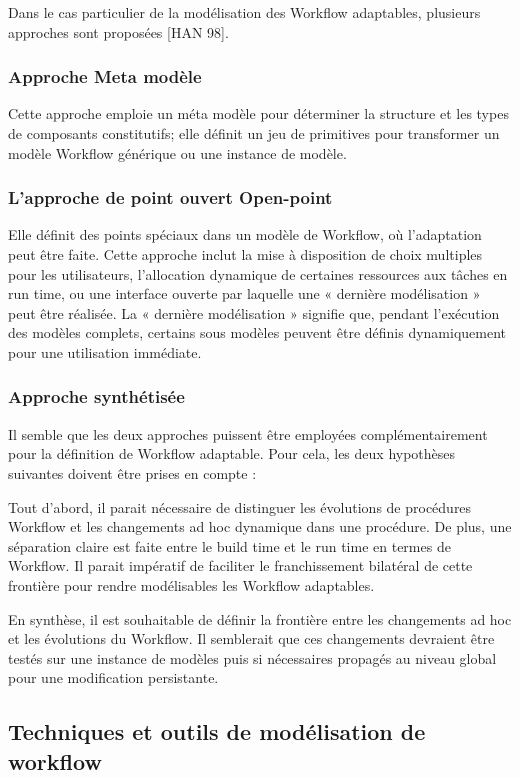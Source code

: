 Dans le cas particulier de la modélisation des Workflow adaptables, plusieurs approches sont proposées [HAN 98]. 

\subsubsection{ Approche Meta modèle}
Cette approche emploie un méta modèle pour déterminer la structure et les types de composants constitutifs; elle définit un jeu de primitives pour transformer un modèle Workflow générique ou une instance de modèle. 

\subsubsection{ L’approche de point ouvert Open-point }
Elle définit des points spéciaux dans un modèle de Workflow, où l’adaptation peut être faite. Cette approche inclut la mise à disposition de choix multiples pour les utilisateurs, l’allocation dynamique de certaines ressources aux tâches en run time, ou une interface ouverte par laquelle une « dernière modélisation » peut être réalisée. La « dernière modélisation » signifie que, pendant l’exécution des modèles complets, certains sous modèles peuvent être définis dynamiquement pour une utilisation immédiate. 
\subsubsection{ Approche synthétisée}
Il semble que les deux approches puissent être employées complémentairement pour la définition de Workflow adaptable. Pour cela, les deux hypothèses suivantes doivent être prises en compte :

Tout d’abord, il parait nécessaire de distinguer les évolutions de procédures Workflow et les changements ad hoc dynamique dans une procédure. De plus, une séparation claire est faite entre le build time et le run time en termes de Workflow. Il parait impératif de faciliter le franchissement bilatéral de cette frontière pour rendre modélisables les Workflow adaptables.

En synthèse, il est souhaitable de définir la frontière entre les changements ad hoc et les évolutions du Workflow. Il semblerait que ces changements devraient être testés sur une instance de modèles puis si nécessaires propagés au niveau global pour une modification persistante.

\subsection{Techniques et outils de modélisation de workflow}

